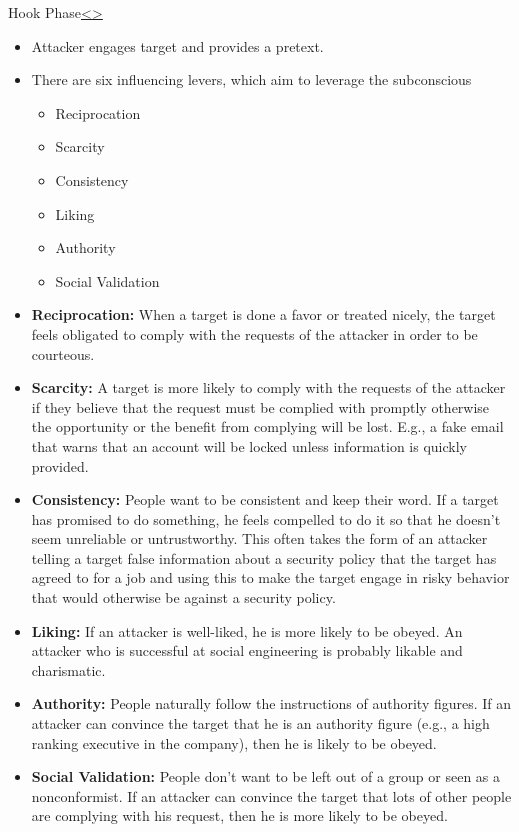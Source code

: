 \documentclass[12pt]{extarticle}
\newenvironment{instructionblock}{\Large\bgroup}{\egroup}
\begin{document}
\pagebreak
\begin{slide}{Hook Phase}{\hyperref[slide 11]{\textless}\hyperref[slide 13]{\textgreater}}
	\begin{instructionblock}
		\begin{itemize}
			\item Attacker engages target and provides a pretext.
			\item There are  six influencing levers, which aim to leverage the subconscious
			\begin{itemize}
				\item Reciprocation
				\item Scarcity
				\item Consistency
				\item Liking
				\item Authority
				\item Social Validation
			\end{itemize}	
		\end{itemize}
	\end{instructionblock}
\end{slide}
\begin{itemize}
	\item \textbf{Reciprocation:}  When a target is done a favor or treated nicely, the target feels obligated to comply with the requests of the attacker in order to be courteous.\cite{b2}
	
	\item \textbf{Scarcity:}  A target is more likely to comply with the requests of the attacker if they believe that the request must be complied with promptly otherwise the opportunity or the benefit from complying will be lost. E.g., a fake email that warns that an account will be locked unless information is quickly provided.\cite{b2}
	
	\item \textbf{Consistency:}  People want to be consistent and keep their word. If a target has promised to do something, he feels compelled to do it so that he doesn't seem unreliable or untrustworthy. This often takes the form of an attacker telling a target false information about a security policy that the target has agreed to for a job and using this to make the target engage in risky behavior that would otherwise be against a security policy.\cite{b2}

	\item \textbf{Liking:}  If an attacker is well-liked, he is more likely to be obeyed. An attacker who is successful at social engineering is probably likable and charismatic.\cite{b2}
	
	\item \textbf{Authority:} People naturally follow the instructions of authority figures. If an attacker can convince the target that he is an authority figure (e.g., a high ranking executive in the company), then he is likely to be obeyed.\cite{b2}

	\item \textbf{Social Validation:} People don't want to be left out of a group or seen as a nonconformist. If an attacker can convince the target that lots of other people are complying with his request, then he is more likely to be obeyed.\cite{b2}
\end{itemize}
\end{document}
